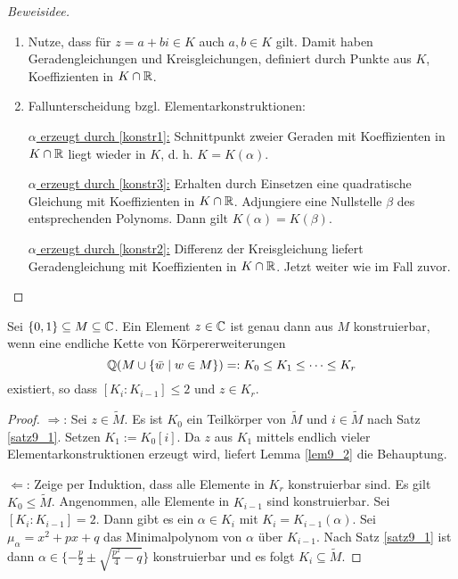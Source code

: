 \begin{proof}[Beweisidee]
	\begin{enumerate}[label=\arabic*.)]
		\item Nutze, dass für $z = a + bi \in K$ auch $a,b \in K$ gilt. Damit haben Geradengleichungen und Kreisgleichungen, definiert durch Punkte aus $K$, Koeffizienten in $K \cap \mathbb{R}$.
		\item Fallunterscheidung bzgl. Elementarkonstruktionen:
		
		\underline{$\alpha$ erzeugt durch \ref{konstr1}:}
		Schnittpunkt zweier Geraden mit Koeffizienten in $K \cap \mathbb{R}$ liegt wieder in $K$, d. h. $K = K(\alpha)$.
		
		\underline{$\alpha$ erzeugt durch \ref{konstr3}:} Erhalten durch Einsetzen eine quadratische Gleichung mit Koeffizienten in $K \cap \mathbb{R}$. Adjungiere eine Nullstelle $\beta$ des entsprechenden Polynoms.  Dann gilt $K(\alpha) = K(\beta)$.
		
		\underline{$\alpha$ erzeugt durch \ref{konstr2}:} Differenz der Kreisgleichung liefert Geradengleichung mit Koeffizienten in $K \cap \mathbb{R}$. Jetzt weiter wie im Fall zuvor.
	\end{enumerate}
\end{proof}
\begin{satz}\label{satz9_3}
	Sei $\{0,1\} \subseteq M \subseteq \mathbb{C}$. Ein Element $z \in \mathbb{C}$ ist genau dann aus $M$ konstruierbar, wenn eine endliche Kette von Körpererweiterungen
	\[\mathbb{Q}(M \cup \{\bar{w} \mid w \in M\}) =: K_0 \leq K_1 \leq \dots \leq K_r\]
	existiert, so dass $[K_i : K_{i-1}] \leq 2$ und $z \in K_r$.
\end{satz}
\begin{proof}
	\glqq$\Rightarrow$\grqq: Sei $z \in \tilde{M}$. Es ist $K_0$ ein Teilkörper von $\tilde{M}$ und $i \in \tilde{M}$ nach Satz \ref{satz9_1}. Setzen $K_1 := K_0[i]$. Da $z$ aus $K_1$ mittels endlich vieler Elementarkonstruktionen erzeugt wird, liefert Lemma \ref{lem9_2} die Behauptung.
	
	\glqq$\Leftarrow$\grqq: Zeige per Induktion, dass alle Elemente in $K_r$ konstruierbar sind. Es gilt $K_0 \leq \tilde{M}$. Angenommen, alle Elemente in $K_{i-1}$ sind konstruierbar. Sei $[K_i : K_{i-1}] = 2$. Dann gibt es ein $\alpha \in K_i$ mit $K_i = K_{i-1} (\alpha)$. Sei $\mu_\alpha = x^2 + px + q$ das Minimalpolynom von $\alpha$ über $K_{i-1}$. Nach Satz \ref{satz9_1} ist dann $\alpha \in \{-\frac{p}{2} \pm \sqrt{\frac{p^2}{4} - q}\}$ konstruierbar und es folgt $K_i \subseteq \tilde{M}$. 
\end{proof}
